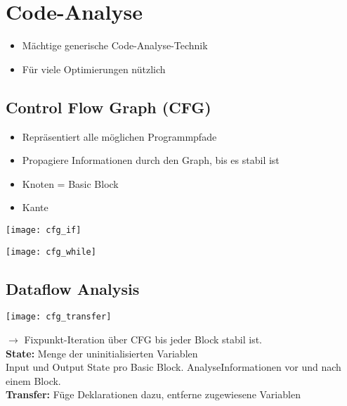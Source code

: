 
\section{Code-Analyse}
\begin{itemize}[topsep=0pt]
    \itemsep -0.2em
    \item Mächtige generische Code-Analyse-Technik
    \item Für viele Optimierungen nützlich
\end{itemize}

\subsection{Control Flow Graph (CFG)}
\begin{itemize}[topsep=0pt]
    \itemsep -0.2em
    \item Repräsentiert alle möglichen Programmpfade
    \item Propagiere Informationen durch den Graph, bis es stabil ist
    \item Knoten = Basic Block
    \item Kante
\end{itemize}
\begin{minipage}{0.6\linewidth}
    \texttt{[image: cfg\_if]}
\end{minipage}
\begin{minipage}{0.4\linewidth}
    \texttt{[image: cfg\_while]}
\end{minipage}

\subsection{Dataflow Analysis}
\begin{minipage}{0.5\linewidth}
    \texttt{[image: cfg\_transfer]}
\end{minipage}
\begin{minipage}{0.5\linewidth}
    $\rightarrow$ Fixpunkt-Iteration über CFG bis jeder Block stabil ist.\\
    \textbf{State:} Menge der uninitialisierten Variablen\\
    Input und Output State pro Basic Block. AnalyseInformationen vor und nach einem Block.\\
    \textbf{Transfer:} Füge Deklarationen dazu, entferne zugewiesene Variablen\\
\end{minipage}

